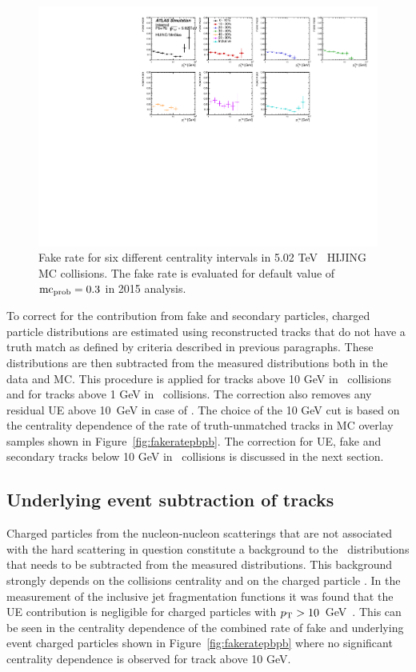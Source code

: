 \begin{figure}
\centering
\includegraphics[width=1.\textwidth]{figures/main/performance/fake_rate_hijingMB.pdf}
\caption{ Fake rate for six different centrality intervals in 5.02 TeV \pbpb\ HIJING MC collisions.
The fake rate is evaluated for default value of $\mbox{${\mathrm{mc}}_{\mathrm{prob}}$} = 0.3$ in 2015 analysis.}
\label{fig:fakeratehijing}
\end{figure}


To correct for the contribution from fake and secondary particles, charged particle distributions are estimated using reconstructed tracks that do not have a truth match as defined by criteria described in previous paragraphs.
These distributions are then subtracted from the measured distributions both in the data and MC.
This procedure is applied for tracks above 10 GeV in \PbPb\ collisions and for tracks above 1 GeV in \pp\ collisions.
The correction also removes any residual UE above 10~GeV in case of \PbPb.
The choice of the 10 GeV cut is based on the centrality dependence of the rate of truth-unmatched tracks in MC overlay samples shown in Figure~\ref{fig:fakeratepbpb}.
The correction for UE, fake and secondary tracks below 10 GeV in \PbPb\ collisions is discussed in the next section.


\subsection{Underlying event subtraction of tracks}
\label{sec:cuts_UE}
Charged particles from the nucleon-nucleon scatterings that are not associated with the hard scattering in question constitute a background to the \Dptr\ distributions that needs to be subtracted from the measured distributions.
This background strongly depends on the collisions centrality and on the charged particle \pt.
In the measurement of the inclusive jet fragmentation functions it was found that the UE contribution is negligible for charged particles with $\mbox{$p_{\mathrm{T}}$}>10$~GeV~\cite{PhysRevC.98.024908}.
This can be seen in the centrality dependence of the combined rate of fake and underlying event charged particles shown in Figure~\ref{fig:fakeratepbpb} where no significant centrality dependence is observed for track above 10 GeV.

